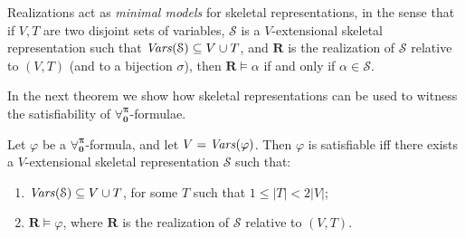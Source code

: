 \documentclass[a4paper,UKenglish]{lipics}
\newcommand{\Lang}{\ensuremath{\mathbf{\forall_{0}^{\pi}}}\xspace}
\newcommand{\atset}{\mathcal{S}}
\newcommand{\real}{\mathbf{R}}
\begin{document}
Realizations act as \emph{minimal models} for skeletal
representations, in the sense that if $V,T$ are two disjoint sets of
variables, $\atset$ is a $V$-extensional skeletal representation such
that $\Vars(\atset) \subseteq V \cup T$, and $\real$ is the
realization of $\atset$ relative to $(V,T)$ (and to a bijection
$\sigma$), then $\real \models \alpha$ if and only if $\alpha \in
\atset$.

In the next theorem we show how skeletal representations can be
used to witness the satisfiability of \Lang-formulae.

\begin{theorem}\label{SAT}
Let $\varphi$ be a \Lang-formula, and let $V=\mathit{Vars}(\varphi)$. Then
$\varphi$
is satisfiable iff there exists a $V$-extensional
skeletal representation $\atset$ such that:
\begin{enumerate}[label=(\roman*),leftmargin=18pt]
 \item\label{SAT1} $\Vars(\atset) \subseteq V \cup T$, for some $T$
 such that $1 \leq |T| < 2|V|$;

 \item\label{SAT3} $\real \models \varphi$, where $\real$ is the
 realization of $\atset$ relative to $(V,T)$.
\end{enumerate}

\end{theorem}
\end{document}
